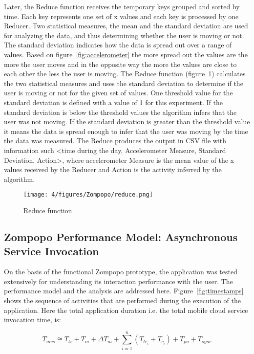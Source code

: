 Later, the Reduce function receives the temporary keys grouped and sorted by time. Each key represents one set of x values and each key is processed by one Reducer. Two statistical measures, the mean and the standard deviation are used for analyzing the data, and thus determining whether the user is moving or not. The standard deviation indicates how the data is spread out over a range of values. Based on figure~\ref{fig:accelerometer} the more spread out the values are the more the user moves and in the opposite way the more the values are close to each other the less the user is moving. The Reduce function (figure~\ref{fig:reduce}) calculates the two statistical measures and uses the standard deviation to determine if the user is moving or not for the given set of values. One threshold value for the standard deviation is defined with a value of 1 for this experiment. If the standard deviation is below the threshold values the algorithm infers that the user was not moving. If the standard deviation is greater than the threshold value it means the data is spread enough to infer that the user was moving by the time the data was measured. The Reduce produces the output in CSV file with information such \textless time during the day, Accelerometer Measure, Standard Deviation, Action\textgreater, where accelerometer Measure is the mean value of the x values received by the Reducer and Action is the activity inferred by the algorithm.

\begin{figure}
\centering
\texttt{[image: 4/figures/Zompopo/reduce.png]}
\caption{Reduce function }
\label{fig:reduce}
\end{figure}


\subsection{Zompopo Performance Model: Asynchronous Service Invocation}

On the basis of the functional Zompopo prototype, the application was tested extensively for understanding its interaction performance with the user. The performance model and the analysis are addressed here. Figure~\ref{fig:timestamps} shows the sequence of activities that are performed during the execution of the application. Here the total application duration i.e. the total mobile cloud service invocation time, is:

\begin{equation}
T_{{mcs}} \cong  T_{tr} + T_m + \Delta T_m + \sum_{i=1}^n (T_{{te}_i} + T_{c_i}) + T_{pn} + T_{sync}  \label{eqn:mcs:mware:times}
\end{equation}


